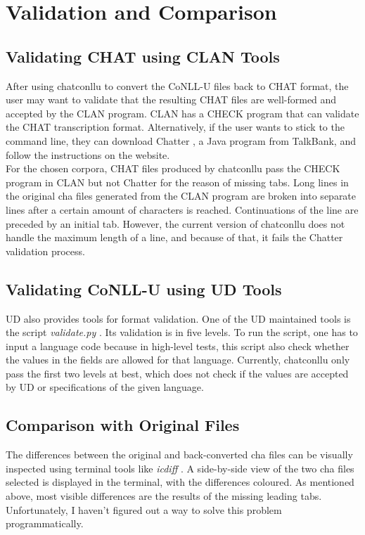 \chapter{Validation and Comparison} %

\label{Chapter5} %

\section{Validating CHAT using CLAN Tools}

After using chatconllu to convert the CoNLL-U files back to CHAT format, the user may want to validate that the resulting CHAT files are well-formed and accepted by the CLAN program. CLAN has a CHECK program  that can validate the CHAT transcription format. Alternatively, if the user wants to stick to the command line, they can download Chatter , a Java program from TalkBank, and follow the instructions on the website.\\

For the chosen corpora, CHAT files produced by chatconllu pass the CHECK program in CLAN but not Chatter for the reason of missing tabs. Long lines in the original cha files generated from the CLAN program are broken into separate lines after a certain amount of characters is reached. Continuations of the line are preceded by an initial tab. However, the current version of chatconllu does not handle the maximum length of a line, and because of that, it fails the Chatter validation process.
\vspace{-0.4em}
\section{Validating CoNLL-U using UD Tools}

UD also provides tools for format validation. One of the UD maintained tools is the script \emph{validate.py} . Its validation is in five levels. To run the script, one has to input a language code because in high-level tests, this script also check whether the values in the fields are allowed for that language. Currently, chatconllu only pass the first two levels at best, which does not check if the values are accepted by UD or specifications of the given language.
\vspace{-0.4em}
\section{Comparison with Original Files}
The differences between the original and back-converted cha files can be visually inspected using terminal tools like \emph{icdiff} . A side-by-side view of the two cha files selected is displayed in the terminal, with the differences coloured. As mentioned above, most visible differences are the results of the missing leading tabs. Unfortunately, I haven't figured out a way to solve this problem programmatically.
